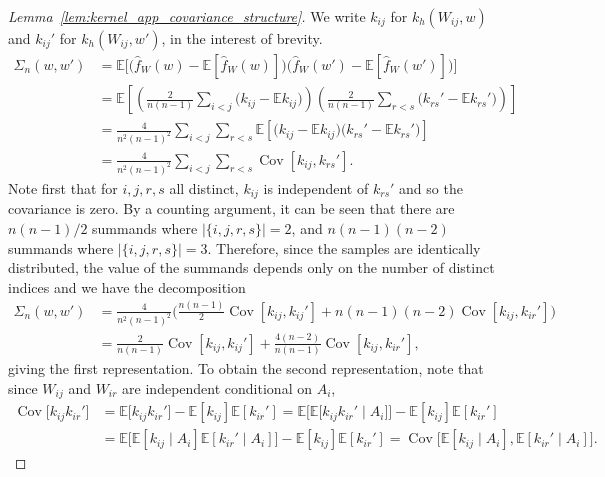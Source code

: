 \documentclass[11pt,lof]{puthesis}
\newcommand{\E}{\ensuremath{\mathbb{E}}}
\DeclareMathOperator{\Cov}{Cov}
\theoremstyle{break}
\theoremstyle{proof}
\newtheorem{proof}{Proof}
\begin{document}
\begin{proof}[Lemma~\ref{lem:kernel_app_covariance_structure}]

We write $k_{i j}$ for $k_h(W_{i j},w)$
and $k_{i j}'$ for $k_h(W_{i j},w')$, in the interest of brevity.
%
\begin{align*}
\Sigma_n(w,w')
&=
\E\Big[
\big(
\hat f_W(w)
- \E[\hat f_W(w)]
\big)
\big(
\hat f_W(w')
- \E[\hat f_W(w')]
\big)
\Big] \\
&=
\E\left[
\left(
\frac{2}{n(n-1)}
\sum_{i<j}
\big(
k_{i j} - \E k_{i j}
\big)
\right)
\left(
\frac{2}{n(n-1)}
\sum_{r<s}
\big(
k_{rs}' - \E k_{rs}'
\big)
\right)
\right] \\
&=
\frac{4}{n^2(n-1)^2}
\sum_{i<j}
\sum_{r<s}
\E\left[
\big(
k_{i j} - \E k_{i j}
\big)
\big(
k_{rs}' - \E k_{rs}'
\big)
\right] \\
&=
\frac{4}{n^2(n-1)^2}
\sum_{i<j}
\sum_{r<s}
\Cov\left[
k_{i j},
k_{rs}'
\right].
\end{align*}
%
Note first that
for $i,j,r,s$ all distinct,
$k_{i j}$ is independent of $k_{rs}'$
and so the covariance is zero.
By a counting argument,
it can be seen that
there are
$n(n-1)/2$
summands where
$|\{i,j,r,s\}| = 2$,
and
$n(n-1)(n-2)$
summands where
$|\{i,j,r,s\}| = 3$.
Therefore, since the samples
are identically distributed,
the value of the summands
depends only on the number of distinct indices
and we have the decomposition
%
\begin{align*}
\Sigma_n(w,w')
&=
\frac{4}{n^2(n-1)^2}
\bigg(
\frac{n(n-1)}{2}
\Cov[k_{i j}, k_{i j}']
+ n(n-1)(n-2)
\Cov[k_{i j}, k_{i r}']
\bigg) \\
&=
\frac{2}{n(n-1)}
\Cov[k_{i j}, k_{i j}']
+ \frac{4(n-2)}{n(n-1)}
\Cov[k_{i j}, k_{i r}'],
\end{align*}
%
giving the first representation.
To obtain the second representation,
note that since
$W_{i j}$ and $W_{i r}$
are independent conditional
on $A_i$,
%
\begin{align*}
\Cov\big[
k_{i j}
k_{i r}'
\big]
&=
\E\big[
k_{i j}
k_{i r}'
\big]
-
\E[k_{i j}]
\E[k_{i r}']
=
\E\big[
\E\big[
k_{i j}
k_{i r}'
\mid A_i
\big]
\big]
-
\E[k_{i j}]
\E[k_{i r}'] \\
&=
\E\big[
\E[k_{i j} \mid A_i]
\E[k_{i r}' \mid A_i]
\big]
-
\E[k_{i j}]
\E[k_{i r}']
=
\Cov\big[
\E[k_{i j} \mid A_i],
\E[k_{i r}' \mid A_i]
\big].
\end{align*}
\end{proof}
\end{document}
